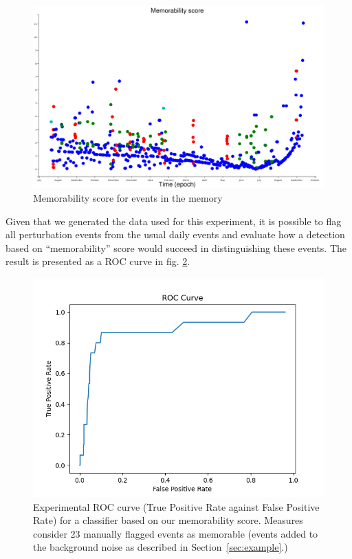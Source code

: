 \documentclass[conference]{IEEEtran}
\begin{document}
\begin{figure}[ht]
  \centering
  \includegraphics[width=\linewidth]{figures/complexities_surprises}
  \caption{Memorability score for events in the memory}
  \label{fig:result1}
\end{figure}

Given that we generated the data used for this experiment, it is possible to
flag all perturbation events from the usual daily events and evaluate how a
detection based on ``memorability'' score would succeed in distinguishing these
events. The result is presented as a ROC curve in fig. \ref{fig:roc}.

\begin{figure}[ht]
  \centering
  \includegraphics[width=\linewidth]{./figures/roc}
  \caption{Experimental ROC curve (True Positive Rate against False Positive
   Rate) for a classifier based on our memorability score. Measures consider 23
   manually flagged events as memorable (events added to the background noise
   as described in Section~\ref{sec:example}.)}
  \label{fig:roc}
\end{figure}
\end{document}
